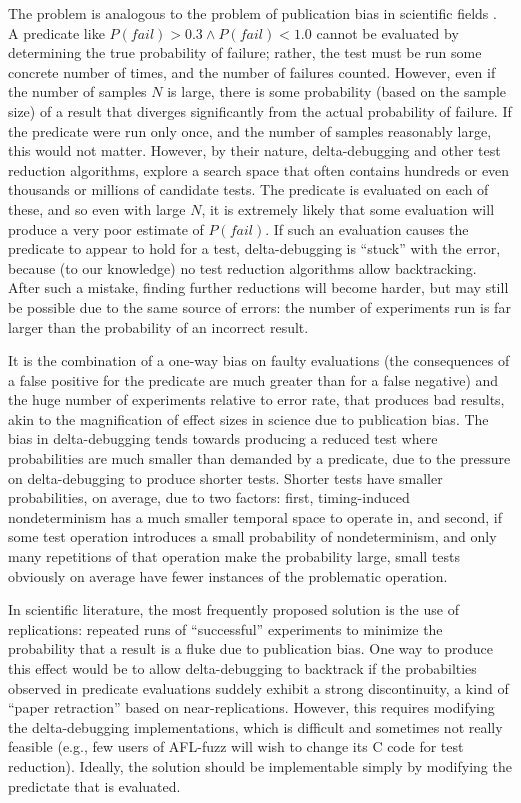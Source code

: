 The problem is analogous to the problem of publication bias in
scientific fields \cite{ahmed2012assessment}.  A predicate like
$P(fail) > 0.3 \wedge P(fail) < 1.0$ cannot be evaluated by
determining the true probability of failure; rather, the test must be
run some concrete number of times, and the number of failures counted.
However, even if the number of samples $N$ is large, there is some
probability (based on the sample size) of a result that diverges
significantly from the actual probability of failure.  If the
predicate were run only once, and the number of samples reasonably
large, this would not matter.  However, by their nature,
delta-debugging and other test reduction algorithms, explore a search
space that often contains hundreds or even thousands or millions of
candidate tests.  The predicate is evaluated on each of these, and so
even with large $N$, it is extremely likely that some evaluation will
produce a very poor estimate of $P(fail)$.  If such an evaluation
causes the predicate to appear to hold for a test, delta-debugging is
``stuck'' with the error, because (to our knowledge) no test reduction
algorithms allow backtracking.  After such a mistake, finding further
reductions will become harder, but may still be possible due to the
same source of errors:  the number of experiments run is far larger
than the probability of an incorrect result.

It is the combination of
a one-way bias on faulty evaluations (the consequences of a false
positive for the predicate are much greater than for a false negative)
and the huge number of experiments relative to error rate, that
produces bad results, akin to the magnification of effect sizes
in science due to publication bias.  The bias in delta-debugging tends
towards producing a reduced test where probabilities are much smaller
than demanded by a predicate, due to the pressure on delta-debugging
to produce shorter tests.  Shorter tests have smaller probabilities,
on average, due to two factors:  first, timing-induced nondeterminism
has a much smaller temporal space to operate in, and second, if some
test operation introduces a small probability of nondeterminism, and
only many repetitions of that operation make the probability large,
small tests obviously on average have fewer instances of the
problematic operation.

In scientific literature, the most frequently proposed solution is the
use of replications:  repeated runs of ``successful'' experiments to
minimize the probability that a result is a fluke due to publication
bias.  One way to produce this effect would be to allow
delta-debugging to backtrack if the probabilties observed in predicate
evaluations suddely exhibit a strong discontinuity, a kind of ``paper
retraction'' based on near-replications.  However, this requires
modifying the delta-debugging implementations, which is difficult and
sometimes not really feasible (e.g., few users of AFL-fuzz \cite{aflfuzz} will wish
to change its C code for test reduction).  Ideally, the solution
should be implementable simply by modifying the predictate that is
evaluated.  


